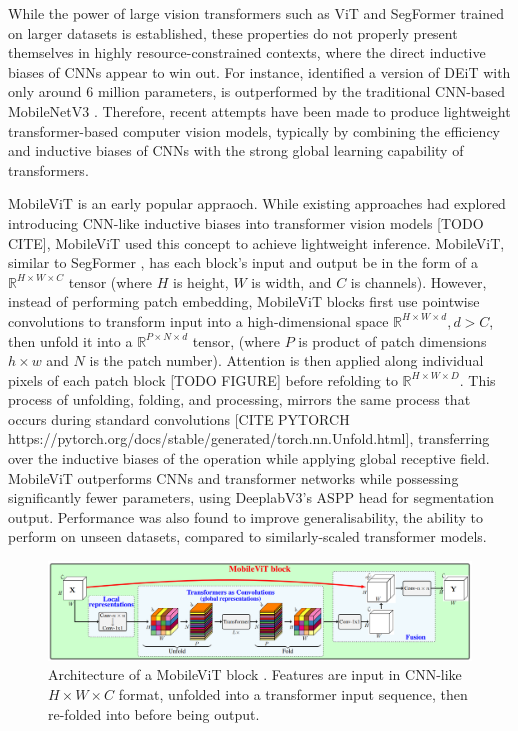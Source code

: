 \documentclass[a4paper,12pt]{report}
\begin{document}
While the power of large vision transformers such as ViT and SegFormer trained on larger datasets is established, these properties do not properly present themselves in highly resource-constrained contexts, where the direct inductive biases of CNNs appear to win out. For instance, \cite{mehta_mobilevit_2022} identified a version of DEiT \cite{touvron_training_2021} with only around 6 million parameters, is outperformed by the traditional CNN-based MobileNetV3 \cite{howard_searching_2019}. Therefore, recent attempts have been made to produce lightweight transformer-based computer vision models, typically by combining the efficiency and inductive biases of CNNs with the strong global learning capability of transformers.

MobileViT \cite{mehta_mobilevit_2022} is an early popular appraoch. While existing approaches had explored introducing CNN-like inductive biases into transformer vision models [TODO CITE], MobileViT \cite{mehta_mobilevit_2022} used this concept to achieve lightweight inference. MobileViT, similar to SegFormer \cite{xie_segformer_2021}, has each block's input and output be in the form of a $\mathbb{R}^{H \times W \times C}$ tensor (where $H$ is height, $W$ is width, and $C$ is channels). However, instead of performing patch embedding, MobileViT blocks first use pointwise convolutions to transform input into a high-dimensional space $\mathbb{R}^{H \times W \times d}, d > C$, then unfold it into a $\mathbb{R}^{P \times N \times d}$ tensor, (where $P$ is product of patch dimensions $h \times w$ and $N$ is the patch number). Attention is then applied along individual pixels of each patch block [TODO FIGURE] before refolding to $\mathbb{R}^{H \times W \times D}$. This process of unfolding, folding, and processing, mirrors the same process that occurs during standard convolutions [CITE PYTORCH https://pytorch.org/docs/stable/generated/torch.nn.Unfold.html], transferring over the inductive biases of the operation while applying global receptive field. MobileViT outperforms CNNs and transformer networks while possessing significantly fewer parameters, using DeeplabV3's ASPP head \cite{chen_rethinking_2017} for segmentation output. Performance was also found to improve generalisability, the ability to perform on unseen datasets, compared to similarly-scaled transformer models.

\begin{figure}[ht!]
    \centering
    \includegraphics[width=\textwidth]{res/mobilevit-block.png}
    \caption{Architecture of a MobileViT block \cite{mehta_mobilevit_2022}. Features are input in CNN-like $H \times W \times C$ format, unfolded into a transformer input sequence, then re-folded into before being output.}
    \label{fig:mobilevit_block}
\end{figure}
\end{document}
